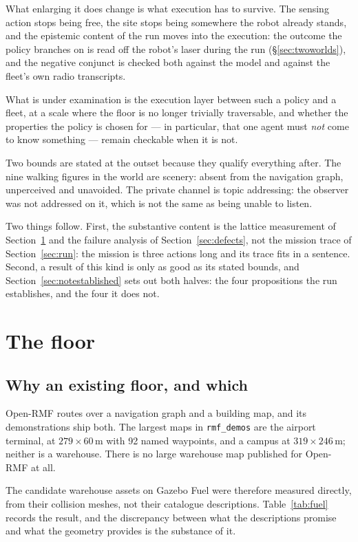 \documentclass[11pt,a4paper]{article}
\theoremstyle{definition}
\newcommand{\code}[1]{\texttt{\small #1}}
\begin{document}
What enlarging it does change is what execution has to survive. The sensing
action stops being free, the site stops being somewhere the robot already
stands, and the epistemic content of the run moves into the execution: the
outcome the policy branches on is read off the robot's laser during the run
(\S\ref{sec:twoworlds}), and the negative conjunct is checked both against the
model and against the fleet's own radio transcripts.

What is under examination is the execution layer between such a policy and a
fleet, at a scale where the floor is no longer trivially traversable, and
whether the properties the policy is chosen for --- in particular, that one
agent must \emph{not} come to know something --- remain checkable when it is
not.

Two bounds are stated at the outset because they qualify everything after.
The nine walking figures in the world are scenery: absent from the navigation
graph, unperceived and unavoided. The private channel is topic addressing: the
observer was not addressed on it, which is not the same as being unable to
listen.

Two things follow. First, the substantive content is the lattice measurement
of Section~\ref{sec:floor} and the failure analysis of
Section~\ref{sec:defects}, not the mission trace of Section~\ref{sec:run}: the
mission is three actions long and its trace fits in a sentence. Second, a result of this kind is only as good as its stated bounds, and Section~\ref{sec:notestablished} sets out both halves: the four propositions
the run establishes, and the four it does not.

\section{The floor}
\label{sec:floor}

\subsection{Why an existing floor, and which}

Open-RMF routes over a navigation graph and a building map, and its
demonstrations ship both. The largest maps in \code{rmf\_demos} are the airport
terminal, at $279 \times 60$\,m with 92 named waypoints, and a campus at
$319 \times 246$\,m; neither is a warehouse. There is no large warehouse map
published for Open-RMF at all.

The candidate warehouse assets on Gazebo Fuel were therefore measured directly,
from their collision meshes, not their catalogue descriptions.
Table~\ref{tab:fuel} records the result, and the discrepancy between what the
descriptions promise and what the geometry provides is the substance of it.
\end{document}
